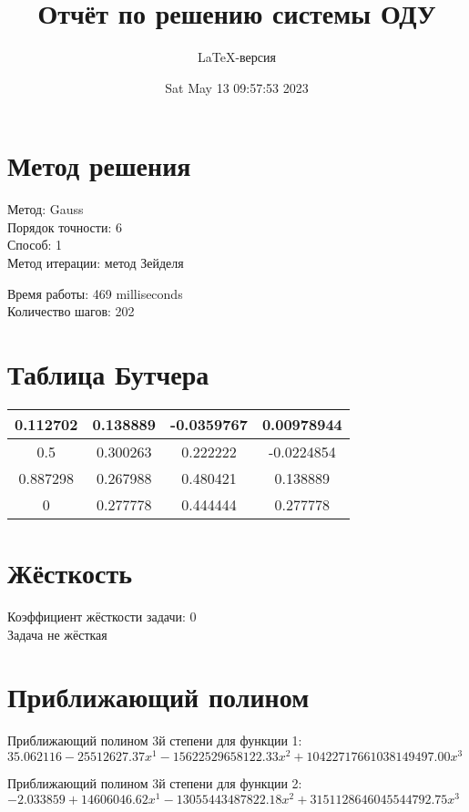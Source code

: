 \documentclass[a4paper,14pt]{extarticle}
\title{Отчёт по решению системы ОДУ}
\author{LaTeX-версия}
\date{Sat May 13 09:57:53 2023}
\begin{document}
\maketitle

\tableofcontents
\pagebreak

\section{Метод решения}

Метод: Gauss\\
Порядок точности: 6\\
Способ: 1\\
Метод итерации: метод Зейделя

Время работы: 469 milliseconds\\
Количество шагов: 202\\
\section{Таблица Бутчера}

\begin{table}[h]
\centering
\begin{tabular}{|c||c|c|c|}
\hline
0.112702 & 0.138889 & -0.0359767 & 0.00978944\\
\hline
0.5 & 0.300263 & 0.222222 & -0.0224854\\
\hline
0.887298 & 0.267988 & 0.480421 & 0.138889\\
\hline
0 & \cellcolor{lightgray} 0.277778 & \cellcolor{lightgray} 0.444444 & \cellcolor{lightgray} 0.277778\\
\hline
\end{tabular}
\end{table}

\section{Жёсткость}

Коэффициент жёсткости задачи: 0\\
Задача не жёсткая

\section{Приближающий полином}

Приближающий полином 3й степени для функции 1: $35.062116 - 25512627.37x^1 - 15622529658122.33x^2 + 10422717661038149497.00x^3$

Приближающий полином 3й степени для функции 2: $-2.033859 + 14606046.62x^1 - 13055443487822.18x^2 + 3151128646045544792.75x^3$
\end{document}
